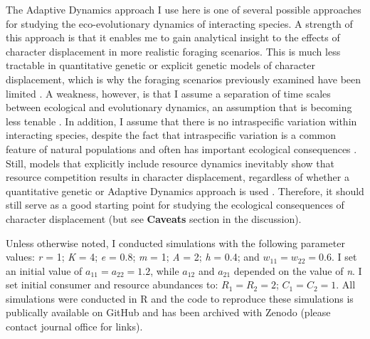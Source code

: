 \documentclass[11pt,]{article}
\begin{document}
The Adaptive Dynamics approach I use here is one of several possible
approaches for studying the eco-evolutionary dynamics of interacting
species. A strength of this approach is that it enables me to gain
analytical insight to the effects of character displacement in more
realistic foraging scenarios. This is much less tractable in
quantitative genetic \citep{Taper1985, McPeek2017} or explicit genetic
\citep{Doebeli1996} models of character displacement, which is why the
foraging scenarios previously examined have been limited \citep[but
see][]{McPeek2017}. A weakness, however, is that I assume a separation
of time scales between ecological and evolutionary dynamics, an
assumption that is becoming less tenable
\citep{Hairston2005, Hendry2016}. In addition, I assume that there is no
intraspecific variation within interacting species, despite the fact
that intraspecific variation is a common feature of natural populations
and often has important ecological consequences
\citep{Bolnick2011, Des_Roches2018}. Still, models that explicitly
include resource dynamics inevitably show that resource competition
results in character displacement, regardless of whether a quantitative
genetic or Adaptive Dynamics approach is used
\citep{Lawlor1976, Taper1985}. Therefore, it should still serve as a
good starting point for studying the ecological consequences of
character displacement (but see \textbf{Caveats} section in the
discussion).

Unless otherwise noted, I conducted simulations with the following
parameter values: \emph{r} = 1; \emph{K} = 4; \emph{e} = 0.8; \emph{m} =
1; \emph{A} = 2; \emph{h} = 0.4; and \(w_{11} = w_{22} = 0.6\). I set an
initial value of \(a_{11} = a_{22} = 1.2\), while \(a_{12}\) and
\(a_{21}\) depended on the value of \emph{n}. I set initial consumer and
resource abundances to: \(R_1 = R_2 = 2\); \(C_1 = C_2 = 1\). All
simulations were conducted in R \citep{R} and the code to reproduce
these simulations is publically available on GitHub and has been
archived with Zenodo (please contact journal office for links).
\end{document}
